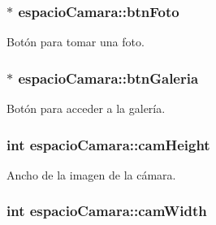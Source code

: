 \subsubsection[{btn\+Foto}]{$\ast$ espacio\+Camara\+::btn\+Foto\hspace{0.3cm}{\ttfamily [private]}}\label{classespacio_camara_a0a33e016b145a3ad2723d6d120260f48}


Botón para tomar una foto. 

\hypertarget{classespacio_camara_a3d110b2810a8ba6579857dd7f8a6fe22}{}
\subsubsection[{btn\+Galeria}]{$\ast$ espacio\+Camara\+::btn\+Galeria\hspace{0.3cm}{\ttfamily [private]}}\label{classespacio_camara_a3d110b2810a8ba6579857dd7f8a6fe22}


Botón para acceder a la galería. 

\hypertarget{classespacio_camara_ac9c3980d5710ce9ae83a95a4e7d4bf3a}{}
\subsubsection[{cam\+Height}]{\setlength{\rightskip}{0pt plus 5cm}int espacio\+Camara\+::cam\+Height\hspace{0.3cm}{\ttfamily [private]}}\label{classespacio_camara_ac9c3980d5710ce9ae83a95a4e7d4bf3a}


Ancho de la imagen de la cámara. 

\hypertarget{classespacio_camara_aa357745006c6358ac4919ea079e80caa}{}
\subsubsection[{cam\+Width}]{\setlength{\rightskip}{0pt plus 5cm}int espacio\+Camara\+::cam\+Width\hspace{0.3cm}{\ttfamily [private]}}\label{classespacio_camara_aa357745006c6358ac4919ea079e80caa}


